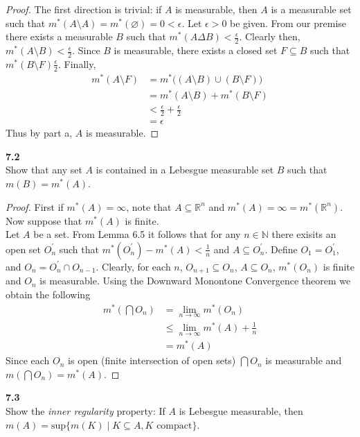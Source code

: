 \documentclass[12pt]{article}
\newcommand{\problem}[1]{\hspace{-4 ex} \large \textbf{#1}\\}
\let\emptyset\varnothing
\begin{document}
	\begin{proof}
		The first direction is trivial: if $A$ is measurable, then $A$ is a measurable set such that $m^*(A \setminus A) = m^*(\emptyset) = 0 < \epsilon$. \bigbreak
		Let $\epsilon > 0$ be given. From our premise there exists a measurable $B$ such that $m^*(A \Delta B) < \tfrac{\epsilon}{2}$. Clearly then, $m^*(A \setminus B) < \tfrac{\epsilon}{2}$. Since $B$ is measurable, there exists a closed set $F \subseteq B$ such that $m^*(B \setminus F) \tfrac{\epsilon}{2}$. Finally,
		\begin{align*}
			m^*(A \setminus F) & = m^*\Big((A \setminus B) \cup (B \setminus F)\Big) \\
			& = m^*(A \setminus B) + m^*(B \setminus F) \\
			& < \tfrac{\epsilon}{2} + \tfrac{\epsilon}{2} \\
			& = \epsilon
		\end{align*}
		Thus by part a, $A$ is measurable.
	\end{proof}

\problem{7.2} Show that any set $A$ is contained in a Lebesgue measurable set $B$ such that $m(B)=m^*(A)$.

	\begin{proof}
		First if $m^*(A) = \infty$, note that $A \subseteq \mathbb{R}^n$ and $m^*(A) = \infty = m^*(\mathbb{R}^n)$. Now suppose that $m^*(A)$ is finite. \\
		Let $A$ be a set. From Lemma 6.5 it follows that for any $n \in \mathbb{N}$ there exisits an open set $O_n^\prime$ such that $m^*(O_n^\prime) - m^*(A) < \tfrac{1}{n}$ and $A \subseteq O_n^\prime$. Define $O_1 = O_1^\prime$, and $O_n = O_{n}^\prime \cap O_{n-1}$. Clearly, for each $n$, $O_{n+1} \subseteq O_n$, $A \subseteq O_n$, $m^*(O_n)$ is finite and $O_n$ is measurable. Using the Downward Monontone Convergence theorem we obtain the following
		\begin{align*}
			m^*(\bigcap O_n) & = \lim_{n \to \infty} m^*(O_n) \\
			& \leq \lim_{n \to \infty} m^*(A) + \tfrac{1}{n} \\
			& = m^*(A)
		\end{align*}
		Since each $O_n$ is open (finite intersection of open sets) $\bigcap O_n$ is measurable and $m(\bigcap O_n) = m^*(A)$.
	\end{proof}

\problem{7.3} Show the \emph{inner regularity} property: If $A$ is Lebesgue measurable, then $m(A)=\text{sup}\{m(K)\mid K\subseteq A, K\text{ compact}\}$.
\end{document}
